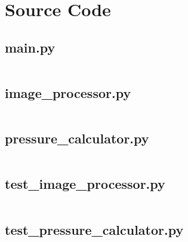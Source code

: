 \section{Source Code}\label{app:source}
	\subsection{main.py}
		\inputminted[breaklines,
					linenos,
					frame=lines,
					fontsize=\footnotesize]{python}{../code/final_program/main.py}
	\subsection{image\_processor.py}
		\inputminted[breaklines,
					linenos,
					frame=lines,
					fontsize=\footnotesize]{python}{../code/final_program/image_processor.py}
	\subsection{pressure\_calculator.py}\label{app:source_pressure_calculator}
		\inputminted[breaklines,
					linenos,
					frame=lines,
					fontsize=\footnotesize]{python}{../code/final_program/pressure_calculator.py}
	\subsection{test\_image\_processor.py}
		\inputminted[breaklines,
					linenos,
					frame=lines,
					fontsize=\footnotesize]{python}{../code/final_program/test_image_processor.py}
	\subsection{test\_pressure\_calculator.py}
		\inputminted[breaklines,
					linenos,
					frame=lines,
					fontsize=\footnotesize]{python}{../code/final_program/test_pressure_calculator.py}